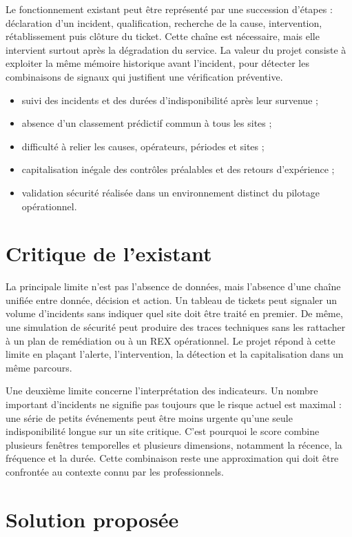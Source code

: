 \documentclass[12pt,a4paper,oneside]{report}
\begin{document}
Le fonctionnement existant peut être représenté par une succession d’étapes : déclaration d’un incident, qualification, recherche de la cause, intervention, rétablissement puis clôture du ticket. Cette chaîne est nécessaire, mais elle intervient surtout après la dégradation du service. La valeur du projet consiste à exploiter la même mémoire historique avant l’incident, pour détecter les combinaisons de signaux qui justifient une vérification préventive.

\begin{itemize}
  \item suivi des incidents et des durées d’indisponibilité après leur survenue ;
  \item absence d’un classement prédictif commun à tous les sites ;
  \item difficulté à relier les causes, opérateurs, périodes et sites ;
  \item capitalisation inégale des contrôles préalables et des retours d’expérience ;
  \item validation sécurité réalisée dans un environnement distinct du pilotage opérationnel.
\end{itemize}

\section{Critique de l’existant}

La principale limite n’est pas l’absence de données, mais l’absence d’une chaîne unifiée entre donnée, décision et action. Un tableau de tickets peut signaler un volume d’incidents sans indiquer quel site doit être traité en premier. De même, une simulation de sécurité peut produire des traces techniques sans les rattacher à un plan de remédiation ou à un REX opérationnel. Le projet répond à cette limite en plaçant l’alerte, l’intervention, la détection et la capitalisation dans un même parcours.

Une deuxième limite concerne l’interprétation des indicateurs. Un nombre important d’incidents ne signifie pas toujours que le risque actuel est maximal : une série de petits événements peut être moins urgente qu’une seule indisponibilité longue sur un site critique. C’est pourquoi le score combine plusieurs fenêtres temporelles et plusieurs dimensions, notamment la récence, la fréquence et la durée. Cette combinaison reste une approximation qui doit être confrontée au contexte connu par les professionnels.

\clearpage
\section{Solution proposée}
\end{document}
